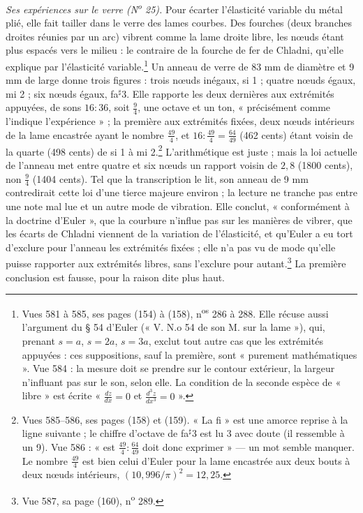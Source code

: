 \documentclass[11pt,a4paper]{article}
\begin{document}
\emph{Ses expériences sur le verre (N\textsuperscript{o} 25).} Pour écarter
l'élasticité variable du métal plié, elle fait tailler dans le verre des lames
courbes. Des fourches (deux branches droites réunies par un arc) vibrent comme la
lame droite libre, les nœuds étant plus espacés vers le milieu : le contraire de
la fourche de fer de Chladni, qu'elle explique par l'élasticité
variable.\footnote{Vues 581 à 585, ses pages (154) à (158),
n\textsuperscript{os} 286 à 288. Elle récuse aussi l'argument du § 54 d'Euler
(« V. N.o 54 de son M. sur la lame »), qui, prenant $s = a$, $s = 2a$, $s = 3a$,
exclut tout autre cas que les extrémités appuyées : ces suppositions, sauf la
première, sont « purement mathématiques ». Vue 584 : la mesure doit se prendre
sur le contour extérieur, la largeur n'influant pas sur le son, selon elle. La
condition de la seconde espèce de « libre » est écrite « $\frac{dz}{dx}=0$ et
$\frac{d^3z}{dx^3}=0$ ».} Un anneau de verre de 83 mm de diamètre et 9 mm de
large donne trois figures : trois nœuds inégaux, si 1 ; quatre nœuds égaux,
mi 2 ; six nœuds égaux, fa$^{\sharp}$3. Elle rapporte les deux dernières aux
extrémités appuyées, de sons $16 : 36$, soit $\frac94$, une octave et un ton,
« précisément comme l'indique l'expérience » ; la première aux extrémités
fixées, deux nœuds intérieurs de la lame encastrée ayant le nombre
$\frac{49}{4}$, et $16 : \frac{49}{4} = \frac{64}{49}$ (462 cents) étant voisin
de la quarte (498 cents) de si 1 à mi 2.\footnote{Vues 585--586, ses pages (158)
et (159). « La fi » est une amorce reprise à la ligne suivante ; le chiffre
d'octave de fa$^{\sharp}$3 est lu 3 avec doute (il ressemble à un 9). Vue 586 :
« est $\frac{49}{4}:\frac{64}{49}$ doit donc exprimer » — un mot semble manquer.
Le nombre $\frac{49}{4}$ est bien celui d'Euler pour la lame encastrée aux deux
bouts à deux nœuds intérieurs, $(10{,}996/\pi)^2 = 12{,}25$.} L'arithmétique est
juste ; mais la loi actuelle de l'anneau met entre quatre et six nœuds un
rapport voisin de $2{,}8$ (1800 cents), non $\frac94$ (1404 cents). Tel que la
transcription le lit, son anneau de 9 mm contredirait cette loi d'une tierce
majeure environ ; la lecture ne tranche pas entre une note mal lue et un autre
mode de vibration. Elle conclut, « conformément à la doctrine d'Euler », que la
courbure n'influe pas sur les manières de vibrer, que les écarts de Chladni
viennent de la variation de l'élasticité, et qu'Euler a eu tort d'exclure pour
l'anneau les extrémités fixées ; elle n'a pas vu de mode qu'elle puisse rapporter
aux extrémités libres, sans l'exclure pour autant.\footnote{Vue 587, sa page
(160), n\textsuperscript{o} 289.} La première conclusion est fausse, pour la raison
dite plus haut.
\end{document}
